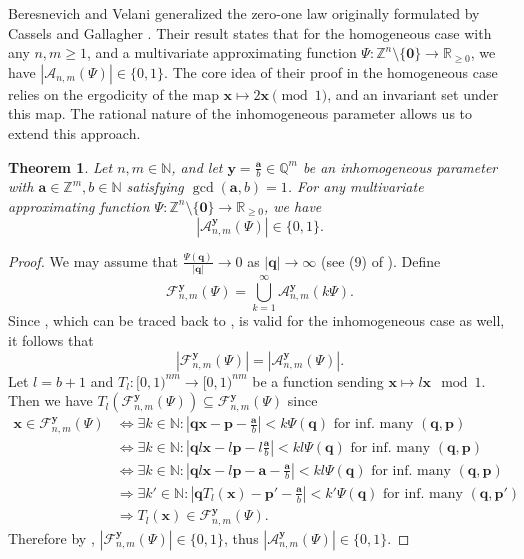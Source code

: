\documentclass[reqno]{amsart}
\newtheorem{theorem}{Theorem}
\theoremstyle{definition}
\theoremstyle{remark}
\begin{document}
Beresnevich and Velani \cite{BV08} generalized the zero-one law originally formulated by Cassels \cite{Cas50} and Gallagher \cite{Gal61}. Their result \cite{BV08} states that for the homogeneous case with any $n,m \geq 1$, and a multivariate approximating function $\Psi: \mathbb{Z}^n \setminus \{\mathbf 0\} \to \mathbb R_{\geq 0}$, we have $|\mathscr A _{n,m} (\Psi)| \in \{0,1\}.$ The core idea of their proof in the homogeneous case relies on the ergodicity of the map $\mathbf{x} \mapsto 2\mathbf{x} \pmod 1$, and an invariant set under this map. The rational nature of the inhomogeneous parameter allows us to extend this approach.
\begin{theorem}\label{thm6}
    Let $n,m \in \mathbb{N}$, and let $\mathbf{y} = \frac{\mathbf{a}}{b} \in \mathbb{Q}^m$ be an inhomogeneous parameter with $\mathbf{a} \in \mathbb{Z}^m, b\in \mathbb{N}$ satisfying $\gcd(\mathbf{a}, b)=1$. For any multivariate approximating function $\Psi: \mathbb{Z}^n \setminus \{\mathbf 0\} \to \mathbb R_{\geq 0}$, we have
    $$|\mathscr{A}^\mathbf{y}_{n,m}(\Psi)| \in \{0,1\}.$$
\end{theorem}
\begin{proof}
    We may assume that $\frac{\Psi(\mathbf{q})}{|\mathbf q|} \to 0$ as $|\mathbf{q}| \to \infty$ (see (9) of \cite{BV08}). Define 
    $$\mathscr{F}^\mathbf{y}_{n,m}(\Psi) = \bigcup_{k=1}^\infty \mathscr{A}^\mathbf{y}_{n,m}(k\Psi).$$
    Since \cite[Lemma 4]{BV08}, which can be traced back to \cite[Lemma 9]{Cas50}, is valid for the inhomogeneous case as well, it follows that
    $$|\mathscr{F}^\mathbf{y}_{n,m}(\Psi)| = |\mathscr{A}^\mathbf{y}_{n,m}(\Psi)|.$$
    Let $l=b+1$ and $T_l : [0,1)^{nm} \to [0,1)^{nm}$ be a function sending $\mathbf{x} \mapsto l\mathbf{x} \mod 1$. Then we have $T_l(\mathscr{F}^\mathbf{y}_{n,m}(\Psi)) \subseteq \mathscr{F}^\mathbf{y}_{n,m}(\Psi)$ since
    \begin{align*}
        \mathbf{x} \in \mathscr{F}^\mathbf{y}_{n,m}(\Psi) &\Leftrightarrow \exists k\in \mathbb{N} : \left|\mathbf{q}\mathbf{x} - \mathbf{p} - \frac{\mathbf{a}}{b}\right| < k\Psi(\mathbf{q}) \text{ for inf. many } (\mathbf{q}, \mathbf{p}) \\
        &\Leftrightarrow \exists k\in \mathbb{N} : \left|\mathbf{q}l\mathbf{x} - l\mathbf{p} - l\frac{\mathbf{a}}{b}\right| < kl\Psi(\mathbf{q}) \text{ for inf. many } (\mathbf{q}, \mathbf{p}) \\
        &\Leftrightarrow \exists k \in \mathbb{N} : \left|\mathbf{q}l\mathbf{x} - l\mathbf{p} - \mathbf{a} - \frac{\mathbf{a}}{b}\right| < kl\Psi(\mathbf{q}) \text{ for inf. many } (\mathbf{q}, \mathbf{p}) \\
        &\Rightarrow \exists k' \in \mathbb{N} : \left|\mathbf{q}T_l(\mathbf{x}) - \mathbf{p}'- \frac{\mathbf{a}}{b}\right| < k'\Psi(\mathbf{q}) \text{ for inf. many } (\mathbf{q}, \mathbf{p}') \\
        &\Rightarrow T_l(\mathbf{x}) \in \mathscr{F}^\mathbf{y}_{n,m}(\Psi).
    \end{align*}
    Therefore by \cite[Lemma 2]{BV08}, $|\mathscr{F}^\mathbf{y}_{n,m}(\Psi)| \in \{0,1\}$, thus $|\mathscr{A}^\mathbf{y}_{n,m}(\Psi)| \in \{0,1\}$.
\end{proof}
\end{document}
